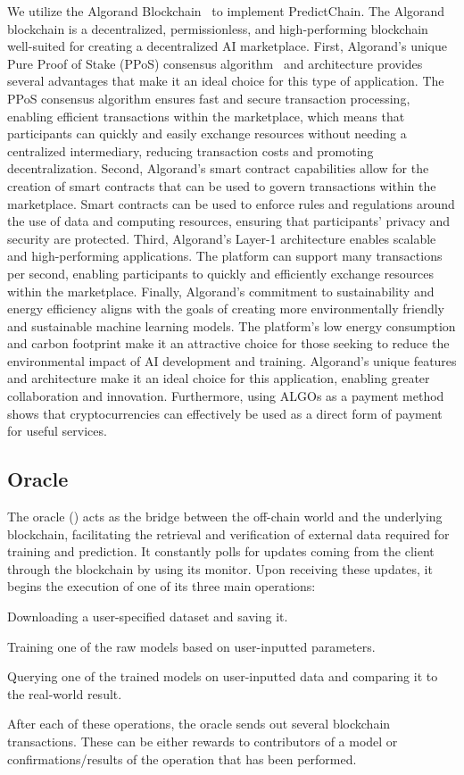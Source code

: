\documentclass{ledger}
\begin{document}
We utilize the Algorand Blockchain~\cite{gilad2017algorand} to implement PredictChain.
The Algorand blockchain is a decentralized, permissionless, and high-performing blockchain well-suited for creating a decentralized AI marketplace. First, Algorand's unique Pure Proof of Stake (PPoS) consensus algorithm~\cite{dimitri2022proof} and architecture provides several advantages that make it an ideal choice for this type of application. The PPoS consensus algorithm ensures fast and secure transaction processing, enabling efficient transactions within the marketplace, which means that participants can quickly and easily exchange resources without needing a centralized intermediary, reducing transaction costs and promoting decentralization.
Second, Algorand's smart contract capabilities allow for the creation of smart contracts that can be used to govern transactions within the marketplace. Smart contracts can be used to enforce rules and regulations around the use of data and computing resources, ensuring that participants' privacy and security are protected.
Third, Algorand's Layer-1 architecture enables scalable and high-performing applications. The platform can support many transactions per second, enabling participants to quickly and efficiently exchange resources within the marketplace.
Finally, Algorand's commitment to sustainability and energy efficiency aligns with the goals of creating more environmentally friendly and sustainable machine learning models. The platform's low energy consumption and carbon footprint make it an attractive choice for those seeking to reduce the environmental impact of AI development and training.
Algorand's unique features and architecture make it an ideal choice for this application, enabling greater collaboration and innovation.
Furthermore, using ALGOs as a payment method shows that cryptocurrencies can effectively be used as a direct form of payment for useful services.

\subsection{Oracle}

The oracle () acts as the bridge between the off-chain world and the underlying blockchain, facilitating the retrieval and verification of external data required for training and prediction.
It constantly polls for updates coming from the client through the blockchain by using its monitor.
Upon receiving these updates, it begins the execution of one of its three main operations:
\begin{enumerate*}
    \item Downloading a user-specified dataset and saving it.
    \item Training one of the raw models based on user-inputted parameters.
    \item Querying one of the trained models on user-inputted data and comparing it to the real-world result.
\end{enumerate*}
After each of these operations, the oracle sends out several blockchain transactions. These can be either rewards to contributors of a model or confirmations/results of the operation that has been performed.
\end{document}
